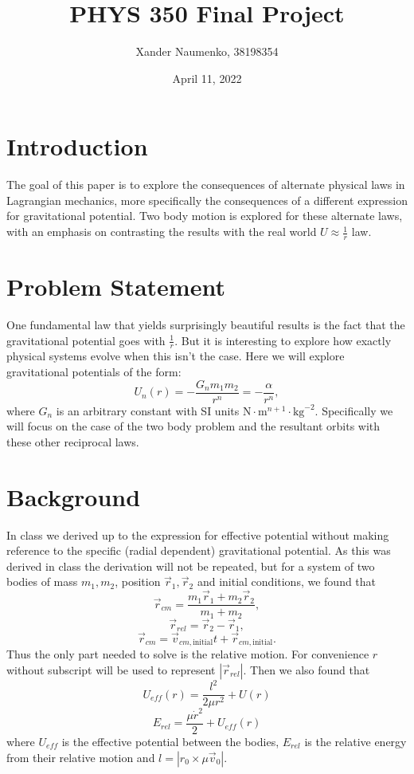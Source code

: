 \documentclass[letterpaper, reqno,11pt]{article}
\begin{document}
\title{PHYS 350 Final Project}
\date{April 11, 2022}
\author{Xander Naumenko, 38198354}
\maketitle

\tableofcontents

\section{Introduction}
 
The goal of this paper is to explore the consequences of alternate physical laws in Lagrangian mechanics, more specifically the consequences of a different expression for gravitational potential. Two body motion is explored for these alternate laws, with an emphasis on contrasting the results with the real world $U\approx\frac{1}{r}$ law. 

\section{Problem Statement}

One fundamental law that yields surprisingly beautiful results is the fact that the gravitational potential goes with $\frac{1}{r}$. But it is interesting to explore how exactly physical systems evolve when this isn't the case. Here we will explore gravitational potentials of the form: 
\[
U_n(r)=-\frac{G_nm_1m_2}{r^{n}}=-\frac{\alpha}{r^{n}}
,\]
where $G_n$ is an arbitrary constant with SI units $\text{N}\cdot \text{m}^{n+1}\cdot \text{kg}^{-2}$. Specifically we will focus on the case of the two body problem and the resultant orbits with these other reciprocal laws. 

\section{Background}

In class we derived up to the expression for effective potential without making reference to the specific (radial dependent) gravitational potential. As this was derived in class the derivation will not be repeated, but for a system of two bodies of mass $ m_1, m_2$, position $\vec r_1, \vec r_2$ and initial conditions, we found that 
\[
\vec r_{cm}=\frac{m_1\vec r_1+m_2\vec r_2}{m_1+m_2}
,\]
\[
\vec r_{rel}=\vec r_2-\vec r_1
,\]
\[
\vec r_{cm}=\vec v_{cm, \text{initial}}t+\vec r_{cm, \text{initial}}
.\]
Thus the only part needed to solve is the relative motion. For convenience $r$ without subscript will be used to represent $|\vec r_{rel}|$. Then we also found that 
 \[
U_{eff}(r)=\frac{l^2}{2\mu r^2}+U(r)
\]
\[
E_{rel}=\frac{\mu\dot r^2}{2}+U_{eff}(r)
\]
where $U_{eff}$ is the effective potential between the bodies, $E_{rel}$ is the relative energy from their relative motion and $l=\left| r_0\times \mu\vec v_0 \right| $. 
\end{document}
